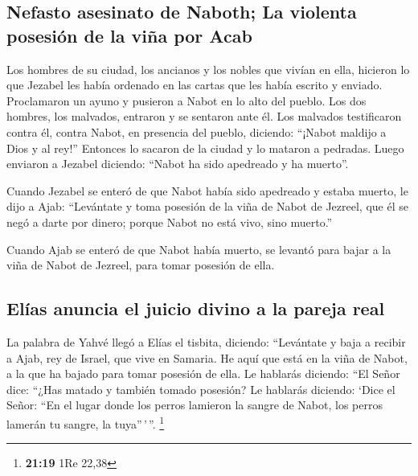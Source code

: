\begin{paracol}{2}
\hypertarget{nefasto-asesinato-de-naboth-la-violenta-posesiuxf3n-de-la-viuxf1a-por-acab}{%
\subsection{Nefasto asesinato de Naboth; La violenta posesión de la viña
por
Acab}\label{nefasto-asesinato-de-naboth-la-violenta-posesiuxf3n-de-la-viuxf1a-por-acab}}

 Los hombres de su ciudad, los ancianos y los nobles que
vivían en ella, hicieron lo que Jezabel les había ordenado en las cartas
que les había escrito y enviado.  Proclamaron un ayuno y
pusieron a Nabot en lo alto del pueblo.  Los dos hombres,
los malvados, entraron y se sentaron ante él. Los malvados testificaron
contra él, contra Nabot, en presencia del pueblo, diciendo: ``¡Nabot
maldijo a Dios y al rey!'' Entonces lo sacaron de la ciudad y lo mataron
a pedradas.  Luego enviaron a Jezabel diciendo: ``Nabot
ha sido apedreado y ha muerto''.

 Cuando Jezabel se enteró de que Nabot había sido
apedreado y estaba muerto, le dijo a Ajab: ``Levántate y toma posesión
de la viña de Nabot de Jezreel, que él se negó a darte por dinero;
porque Nabot no está vivo, sino muerto.''

 Cuando Ajab se enteró de que Nabot había muerto, se
levantó para bajar a la viña de Nabot de Jezreel, para tomar posesión de
ella.

\hypertarget{eluxedas-anuncia-el-juicio-divino-a-la-pareja-real}{%
\subsection{Elías anuncia el juicio divino a la pareja
real}\label{eluxedas-anuncia-el-juicio-divino-a-la-pareja-real}}

 La palabra de Yahvé llegó a Elías el tisbita, diciendo:
 ``Levántate y baja a recibir a Ajab, rey de Israel, que
vive en Samaria. He aquí que está en la viña de Nabot, a la que ha
bajado para tomar posesión de ella.  Le hablarás
diciendo: ``El Señor dice: ``¿Has matado y también tomado posesión? Le
hablarás diciendo: `Dice el Señor: ``En el lugar donde los perros
lamieron la sangre de Nabot, los perros lamerán tu sangre, la
tuya''\,'\,''. \footnote{\textbf{21:19} 1Re 22,38}


\end{paracol}
